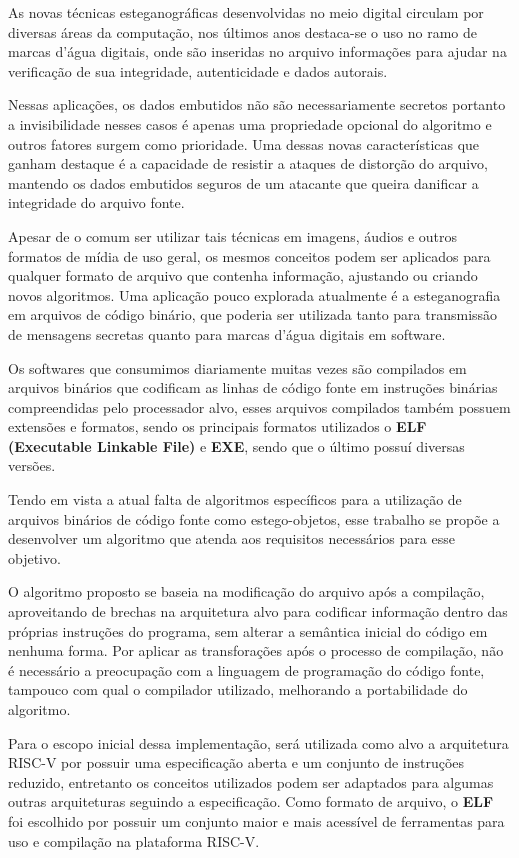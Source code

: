 As novas técnicas esteganográficas desenvolvidas no meio digital circulam por diversas áreas da computação, nos últimos anos destaca-se o uso no ramo de marcas d'água digitais, onde são inseridas no arquivo informações para ajudar na verificação de sua integridade, autenticidade e dados autorais.

Nessas aplicações, os dados embutidos não são necessariamente secretos portanto a invisibilidade nesses casos é apenas uma propriedade opcional do algoritmo e outros fatores surgem como prioridade. Uma dessas novas características que ganham destaque é a capacidade de resistir a ataques de distorção do arquivo, mantendo os dados embutidos seguros de um atacante que queira danificar a integridade do arquivo fonte.

Apesar de o comum ser utilizar tais técnicas em imagens, áudios e outros formatos de mídia de uso geral, os mesmos conceitos podem ser aplicados para qualquer formato de arquivo que contenha informação, ajustando ou criando novos algoritmos. Uma aplicação pouco explorada atualmente é a esteganografia em arquivos de código binário, que poderia ser utilizada tanto para transmissão de mensagens secretas quanto para marcas d'água digitais em software.

Os softwares que consumimos diariamente muitas vezes são compilados em arquivos binários que codificam as linhas de código fonte em instruções binárias compreendidas pelo processador alvo, esses arquivos compilados também possuem extensões e formatos, sendo os principais formatos utilizados o \textbf{ELF (Executable Linkable File)} e \textbf{EXE}, sendo que o último possuí diversas versões.

Tendo em vista a atual falta de algoritmos específicos para a utilização de arquivos binários de código fonte como estego-objetos, esse trabalho se propõe a desenvolver um algoritmo que atenda aos requisitos necessários para esse objetivo.

O algoritmo proposto se baseia na modificação do arquivo após a compilação, aproveitando de brechas na arquitetura alvo para codificar informação dentro das próprias instruções do programa, sem alterar a semântica inicial do código em nenhuma forma. Por aplicar as transforações após o processo de compilação, não é necessário a preocupação com a linguagem de programação do código fonte, tampouco com qual o compilador utilizado, melhorando a portabilidade do algoritmo.

Para o escopo inicial dessa implementação, será utilizada como alvo a arquitetura RISC-V por possuir uma especificação aberta e um conjunto de instruções reduzido, entretanto os conceitos utilizados podem ser adaptados para algumas outras arquiteturas seguindo a especificação. Como formato de arquivo, o \textbf{ELF} foi escolhido por possuir um conjunto maior e mais acessível de ferramentas para uso e compilação na plataforma RISC-V.